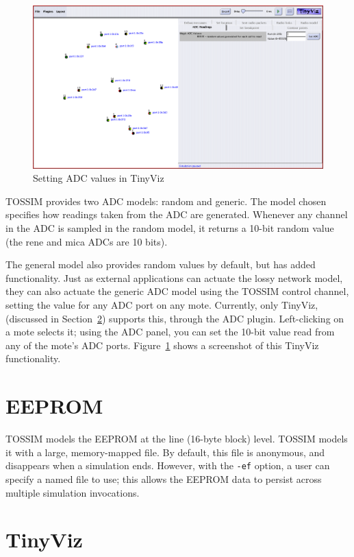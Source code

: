 \documentclass[10pt,fleqn]{article}
\def\sim{TOSSIM\xspace}
\def\tinyviz{TinyViz\xspace}
\begin{document}
\begin{figure}
\centering
\includegraphics[width=6.5in]{fig/adc-viz.png}
\caption{Setting ADC values in \tinyviz}
\label{fig:adc-viz}
\end{figure}


\sim provides two ADC models: random and generic. The model chosen specifies
how readings taken from the ADC are generated. Whenever any channel in
the ADC is sampled in the random model, it returns a 10-bit random
value (the rene and mica ADCs are 10 bits).

The general model also provides random values by default, but has
added functionality. Just as external applications can actuate the
lossy network model, they can also actuate the generic ADC model using
the \sim control channel, setting the value for any ADC port on any
mote. Currently, only \tinyviz, (discussed in
Section~\ref{sec:tinyviz}) supports this, through the ADC
plugin. Left-clicking on a mote selects it; using the ADC panel, you
can set the 10-bit value read from any of the mote's ADC
ports. Figure~\ref{fig:adc-viz} shows a screenshot of this \tinyviz
functionality.

\section{EEPROM}
\label{sec:eeprom}

\sim models the EEPROM at the line (16-byte block) level. \sim models it
with a large, memory-mapped file. By default, this file is anonymous,
and disappears when a simulation ends. However, with the {\tt -ef}
option, a user can specify a named file to use; this allows the EEPROM
data to persist across multiple simulation invocations.


\section{\tinyviz}
\label{sec:tinyviz}
\end{document}
